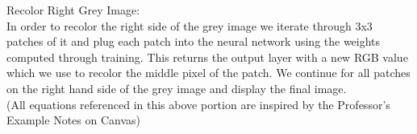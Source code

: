 \documentclass{article}
\theoremstyle{definition}
\begin{document}
        \begin{figure}[H]
            \centering
        \end{figure}
        \begin{figure}[H]
            \centering
        \end{figure}
        \begin{figure}[H]
            \centering
        \end{figure}
        
        Recolor Right Grey Image: \\
        In order to recolor the right side of the grey image we iterate through 3x3 patches of it and plug each patch into the neural network using the weights computed through training. This returns the output layer with a new RGB value which we use to recolor the middle pixel of the patch. We continue for all patches on the right hand side of the grey image and display the final image. \\
        
        (All equations referenced in this above portion are inspired by the Professor's Example Notes on Canvas)
        
    \\\\
    
\end{document}
